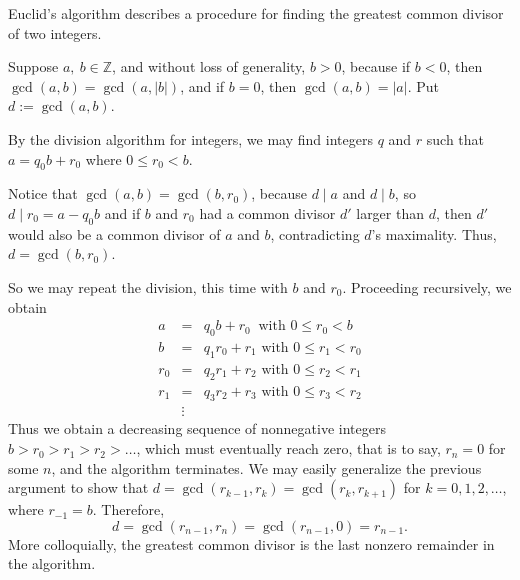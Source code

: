 \documentclass[12pt]{article}
\theoremstyle{definition}
\theoremstyle{definition}
\theoremstyle{definition}
\newcommand{\ZZ}{\mathbb{Z}}
\begin{document}
Euclid's algorithm describes a procedure for finding the greatest common divisor of two integers.

Suppose $a,~b \in \ZZ$, and without loss of generality, $b > 0$, because if $b < 0$, 
then $\gcd(a,b) = \gcd (a, |b| )$, and if $b = 0$, then $\gcd (a,b) = |a| $.  
Put $d := \gcd (a,b)$.

By the division algorithm for integers, we may find integers $q$ and $r$ such that
$a = q_0 b + r_0  $  where $ 0 \leq r_0 < b$.
  
Notice that $\gcd(a,b) = \gcd(b, r_0)$, because $d \mid a$ and $d \mid b$, so $d \mid r_0 = a - q_0b$ and 
if $b$ and $r_0$ had a common divisor $d'$ larger  than $d$, then $d'$ would also be a common divisor of 
$a$ and $b$, contradicting $d$'s maximality.  Thus, $d = \gcd(b, r_0)$.

So we may repeat the division, this time with $b$ and $r_0$.  Proceeding recursively, we obtain
\begin{eqnarray*}
  a   &=& q_0b   + r_0 ~\mbox{  with } 0 \leq r_0 < b    \\
  b   &=& q_1r_0 + r_1 \mbox{ with } 0 \leq r_1 < r_0  \\
  r_0 &=& q_2r_1 + r_2 \mbox{ with } 0 \leq r_2 < r_1  \\
  r_1 &=& q_3r_2 + r_3 \mbox{ with } 0 \leq r_3 < r_2  \\
      &\vdots&
\end{eqnarray*}
Thus we obtain a decreasing sequence of nonnegative integers $b > r_0 > r_1 > r_2 > \dots$, which
must eventually reach zero, that is to say,
$r_n = 0$ for some $n$, and the algorithm terminates.  We may easily generalize the previous 
argument to show that $d = \gcd(r_{k-1}, r_k) = \gcd(r_k, r_{k+1})$ for $k = 0, 1, 2, \dots$, 
where $r_{-1} = b$.  Therefore, \[d = \gcd(r_{n-1}, r_n) = \gcd(r_{n-1}, 0) = r_{n-1}.\]  More 
colloquially, the greatest common divisor is the last nonzero remainder in the algorithm.
\end{document}
